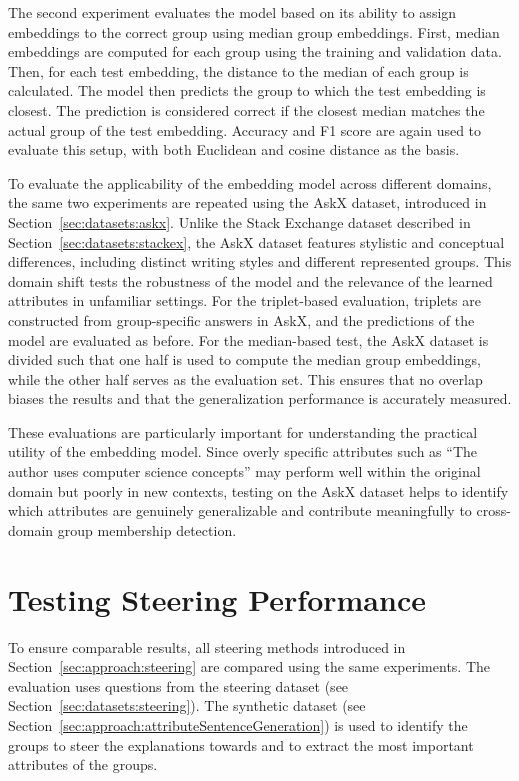 The second experiment evaluates the model based on its ability to assign embeddings to the correct group using median group embeddings. First, median embeddings are computed for each group using the training and validation data. Then, for each test embedding, the distance to the median of each group is calculated. The model then predicts the group to which the test embedding is closest. The prediction is considered correct if the closest median matches the actual group of the test embedding. Accuracy and F1 score are again used to evaluate this setup, with both Euclidean and cosine distance as the basis.

To evaluate the applicability of the embedding model across different domains, the same two experiments are repeated using the AskX dataset, introduced in Section~\ref{sec:datasets:askx}. Unlike the Stack Exchange dataset described in Section~\ref{sec:datasets:stackex}, the AskX dataset features stylistic and conceptual differences, including distinct writing styles and different represented groups. This domain shift tests the robustness of the model and the relevance of the learned attributes in unfamiliar settings. For the triplet-based evaluation, triplets are constructed from group-specific answers in AskX, and the predictions of the model are evaluated as before. For the median-based test, the AskX dataset is divided such that one half is used to compute the median group embeddings, while the other half serves as the evaluation set. This ensures that no overlap biases the results and that the generalization performance is accurately measured.

These evaluations are particularly important for understanding the practical utility of the embedding model. Since overly specific attributes such as \enquote{The author uses computer science concepts} may perform well within the original domain but poorly in new contexts, testing on the AskX dataset helps to identify which attributes are genuinely generalizable and contribute meaningfully to cross-domain group membership detection.


\section{Testing Steering Performance}
\label{sec:experiments:steering}
To ensure comparable results, all steering methods introduced in Section~\ref{sec:approach:steering} are compared using the same experiments. The evaluation uses questions from the steering dataset (see Section~\ref{sec:datasets:steering}). The synthetic dataset (see Section~\ref{sec:approach:attributeSentenceGeneration}) is used to identify the groups to steer the explanations towards and to extract the most important attributes of the groups.

